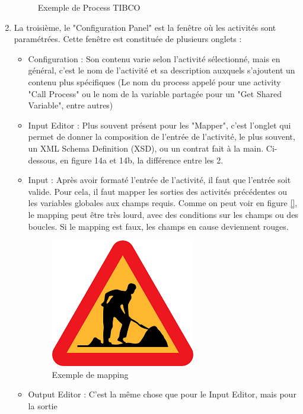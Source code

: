 \begin{enumerate}
\begin{figure}[h!]
		\caption{Exemple de Process TIBCO}
		\label{fig:encours3}
	\end{figure}
\item La troisième, le "Configuration Panel" est la fenêtre où les activités sont paramétrées.
Cette fenêtre est constituée de plusieurs onglets :
\begin{itemize}
	\item  Configuration : Son contenu varie selon l'activité sélectionné, mais en général, c'est
	le nom de l'activité et sa description auxquels s'ajoutent un contenu plus spécifiques
	(Le nom du process appelé pour une activity "Call Process" ou le nom de la variable
	partagée pour un "Get Shared Variable", entre autres)
	\item Input Editor : Plus souvent présent pour les "Mapper", c'est l'onglet qui permet
	de donner la composition de l'entrée de l'activité, le plus souvent, un XML Schema
	Definition (XSD), ou un contrat fait à la main. Ci-dessous, en figure 14a et 14b, la
	différence entre les 2.
	\item Input : Après avoir formaté l'entrée de l'activité, il faut que l'entrée soit valide. Pour
	cela, il faut mapper les sorties des activités précédentes ou les variables globales aux
	champs requis. Comme on peut voir en figure \ref{}, le mapping peut être très lourd,
	avec des conditions sur les champs ou des boucles. Si le mapping est faux, les champs
	en cause deviennent rouges.
	\begin{figure}[h!]
		\centering
		\includegraphics[width=0.7\linewidth]{img/encours}
		\caption{Exemple de mapping}
		\label{fig:encours4}
	\end{figure}
	\item Output Editor : C'est la même chose que pour le Input Editor, mais pour la sortie

\end{itemize}
\end{enumerate}
